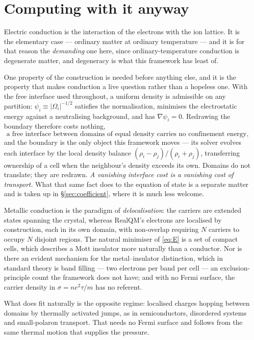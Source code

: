 \documentclass[11pt]{article}
\newcommand{\grad}{\nabla}
\begin{document}
\section{Computing with it anyway}\label{sec:conduction}

Electric conduction is the interaction of the electrons with the ion lattice. It is the elementary
case --- ordinary matter at ordinary temperature --- and it is for that reason the \emph{demanding}
one here, since ordinary-temperature conduction is degenerate matter, and degeneracy is what this
framework has least of.

One property of the construction is needed before anything else, and it is the property that makes
conduction a live question rather than a hopeless one. With the free interface used throughout, a
uniform density is admissible on any partition: $\psi_i\equiv|\Omega_i|^{-1/2}$ satisfies the
normalisation, minimises the electrostatic energy against a neutralising background, and has
$\grad\psi_i=0$. Redrawing the boundary therefore costs nothing,
\begin{equation}\label{eq:Czero}
\text{a free interface between domains of equal density carries no confinement energy,}
\end{equation}
and the boundary is the only object this framework moves --- its solver evolves each interface by the
local density balance $(\rho_i-\rho_j)/(\rho_i+\rho_j)$, transferring ownership of a cell when the
neighbour's density exceeds its own. Domains do not translate; they are redrawn. \emph{A vanishing
interface cost is a vanishing cost of transport.} What that same fact does to the equation of state
is a separate matter and is taken up in \S\ref{sec:coefficient}, where it is much less welcome.

Metallic conduction is the paradigm of \emph{delocalisation}: the carriers are extended states
spanning the crystal, whereas RealQM's electrons are localised by construction, each in its own
domain, with non-overlap requiring $N$ carriers to occupy $N$ disjoint regions. The natural minimiser
of \eqref{eq:E} is a set of compact cells, which describes a Mott insulator more naturally than a
conductor. Nor is there an evident mechanism for the metal--insulator distinction, which in standard
theory is band filling --- two electrons per band per cell --- an exclusion-principle count the
framework does not have; and with no Fermi surface, the carrier density in $\sigma=ne^2\tau/m$ has no
referent.

What does fit naturally is the opposite regime: localised charges hopping between domains by
thermally activated jumps, as in semiconductors, disordered systems and small-polaron transport. That
needs no Fermi surface and follows from the same thermal motion that supplies the pressure.
\end{document}
